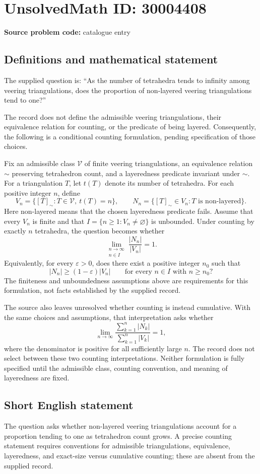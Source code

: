 \documentclass[11pt]{article}
\begin{document}
\section*{UnsolvedMath ID: 30004408}
\textbf{Source problem code:} catalogue entry
\subsection{Definitions and mathematical statement}
The supplied question is: ``As the number of tetrahedra tends to infinity among veering triangulations, does the proportion of non-layered veering triangulations tend to one?''

The record does not define the admissible veering triangulations, their equivalence relation for counting, or the predicate of being layered. Consequently, the following is a conditional counting formulation, pending specification of those choices.

Fix an admissible class \(\mathcal V\) of finite veering triangulations, an equivalence relation \(\sim\) preserving tetrahedron count, and a layeredness predicate invariant under \(\sim\). For a triangulation \(T\), let \(t(T)\) denote its number of tetrahedra. For each positive integer \(n\), define
\[
V_n=\{[T]_{\sim}:T\in\mathcal V,\ t(T)=n\},
\qquad
N_n=\{[T]_{\sim}\in V_n:T\text{ is non-layered}\}.
\]
Here non-layered means that the chosen layeredness predicate fails. Assume that every \(V_n\) is finite and that \(I=\{n\geq 1:V_n\neq\varnothing\}\) is unbounded. Under counting by exactly \(n\) tetrahedra, the question becomes whether
\[
\lim_{\substack{n\to\infty\\n\in I}}
\frac{|N_n|}{|V_n|}=1.
\]
Equivalently, for every \(\varepsilon>0\), does there exist a positive integer \(n_0\) such that
\[
|N_n|\geq(1-\varepsilon)|V_n|
\qquad\text{for every }n\in I\text{ with }n\geq n_0?
\]
The finiteness and unboundedness assumptions above are requirements for this formulation, not facts established by the supplied record.

The source also leaves unresolved whether counting is instead cumulative. With the same choices and assumptions, that interpretation asks whether
\[
\lim_{n\to\infty}
\frac{\sum_{k=1}^{n}|N_k|}{\sum_{k=1}^{n}|V_k|}=1,
\]
where the denominator is positive for all sufficiently large \(n\). The record does not select between these two counting interpretations. Neither formulation is fully specified until the admissible class, counting convention, and meaning of layeredness are fixed.
\subsection{Short English statement}
The question asks whether non-layered veering triangulations account for a proportion tending to one as tetrahedron count grows. A precise counting statement requires conventions for admissible triangulations, equivalence, layeredness, and exact-size versus cumulative counting; these are absent from the supplied record.
\end{document}
